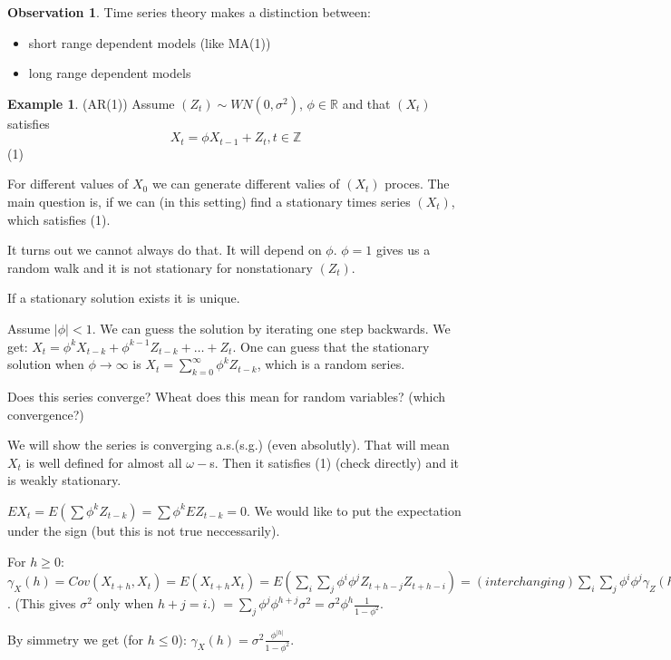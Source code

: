 \documentclass[12pt,a4paper]{amsart}
\theoremstyle{definition} %
\newtheorem{example}[defn]{Example}
\newtheorem{observation}[defn]{Observation}
\theoremstyle{plain} %
\newcommand{\R}{\mathbb R}
\newcommand{\Z}{\mathbb Z}
\begin{document}
\begin{observation}
Time series theory makes a distinction between:
\begin{itemize}
\item short range dependent models (like MA(1))
\item long range dependent models
\end{itemize}
\end{observation}


\begin{example} (AR(1))
Assume $(Z_t) \sim WN(0, \sigma^2)$, $\phi \in \R$ and that $(X_t)$ satisfies 
$$X_t = \phi X_{t-1} +Z_t, t \in \Z$$ 
(1)

For different values of $X_0$ we can generate different valies of $(X_t)$ proces. The main question is, if we can (in this setting) find a stationary times series $(X_t)$, which satisfies
(1).

It turns out we cannot always do that. It will depend on $\phi$. $\phi = 1$ gives us a random walk and it is not stationary for nonstationary $(Z_t)$.

If a stationary solution exists it is unique.

Assume $|\phi| < 1$. We can guess the solution by iterating one step backwards. We get:
$X_t = \phi^kX_{t-k} + \phi^{k-1}Z_{t-k} + \dots + Z_t$.
One can guess that the stationary solution when $\phi \rightarrow \infty$ is $X_t = \sum_{k = 0}^\infty \phi^k Z_{t-k}$, which is a random series. 

Does this series converge? Wheat does this mean for random variables? (which convergence?) 

We will show the series is converging a.s.(s.g.) (even absolutly). That will mean $X_t$ is well defined for almost all $\omega-$s. Then it satisfies 
(1) (check directly) and it is weakly stationary. 

$EX_t = E(\sum \phi^k Z_{t-k}) = \sum \phi^k EZ_{t-k} = 0$. 
We would like to put the expectation under the sign (but this is not true neccessarily). 

For $h \geq 0$: 
$\gamma_X(h) = Cov(X_{t +h }, X_t) = E(X_{t+h}X_t) = E(\sum_i \sum_j \phi^i \phi^j Z_{t + h - j} Z_{t + h - i}) = (interchanging)
\sum_i \sum _j \phi^i \phi^j \gamma_Z(h-i+j)$.
(This gives $\sigma^2$ only when $h+j = i$.)
$= \sum_j \phi^j \phi^{h + j}\sigma^2 = \sigma^2 \phi^h \frac{1}{1 - \phi^2}$.

By simmetry we get (for $h \leq 0$):
$\gamma_X(h) = \sigma^2 \frac{\phi^{|h|}}{1 - \phi^2}$.


\end{example}
\end{document}
